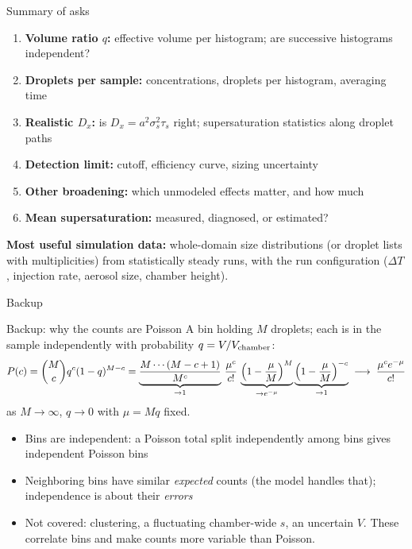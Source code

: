 \documentclass[aspectratio=169,10pt]{beamer}
\newcommand{\ask}[1]{\textcolor{askcol}{\textbf{#1}}}
\begin{document}
\begin{frame}{Summary of asks}
\begin{enumerate}
\item \ask{Volume ratio $q$:} effective volume per histogram; are successive histograms independent?
\item \ask{Droplets per sample:} concentrations, droplets per histogram, averaging time
\item \ask{Realistic $D_x$:} is $D_x = a^2\sigma_s^2\tau_s$ right; supersaturation statistics along droplet paths
\item \ask{Detection limit:} cutoff, efficiency curve, sizing uncertainty
\item \ask{Other broadening:} which unmodeled effects matter, and how much
\item \ask{Mean supersaturation:} measured, diagnosed, or estimated?
\end{enumerate}
\vspace{0.5em}
\textbf{Most useful simulation data:} whole-domain size distributions (or droplet lists with multiplicities) from statistically steady runs, with the run configuration ($\Delta T$, injection rate, aerosol size, chamber height).
\end{frame}

\appendix
\begin{frame}[standout]
Backup
\end{frame}

\begin{frame}{Backup: why the counts are Poisson}
A bin holding $M$ droplets; each is in the sample independently with probability $q = V/V_{\rm chamber}$:
\[
P(c) = \binom{M}{c}q^c(1-q)^{M-c}
= \underbrace{\frac{M\cdots(M-c+1)}{M^c}}_{\to1}\,\frac{\mu^c}{c!}\,\underbrace{\Bigl(1-\frac{\mu}{M}\Bigr)^{M}}_{\to e^{-\mu}}\underbrace{\Bigl(1-\frac{\mu}{M}\Bigr)^{-c}}_{\to1}
\;\longrightarrow\;\frac{\mu^c e^{-\mu}}{c!}
\]
as $M\to\infty$, $q\to0$ with $\mu = Mq$ fixed.
\begin{itemize}
\item Bins are independent: a Poisson total split independently among bins gives independent Poisson bins
\item Neighboring bins have similar \emph{expected} counts (the model handles that); independence is about their \emph{errors}
\item Not covered: clustering, a fluctuating chamber-wide $s$, an uncertain $V$. These correlate bins and make counts more variable than Poisson.
\end{itemize}
\end{frame}
\end{document}
